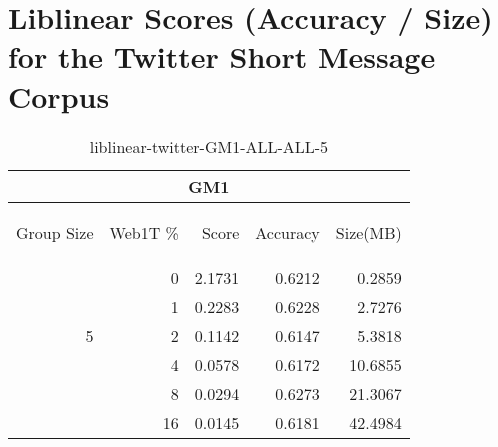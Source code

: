 \chapter{Liblinear Scores (Accuracy / Size) for the Twitter Short Message Corpus}

\begin{center}
\begin{table}[htbp] 
 \begin{center}
\begin{tabular}{ | r | r | r | r | r |}
\hline
\multicolumn{5}{|c|}{GM1}\\
\hline
\begin{sideways}Group Size\end{sideways} & \begin{sideways}Web1T \%\end{sideways} & \begin{sideways}Score\end{sideways} & \begin{sideways}Accuracy\end{sideways} & \begin{sideways}Size(MB)\end{sideways}\\
\hline
\multirow{5}{*}{5}
 & 0 & 2.1731 & 0.6212 & 0.2859\\ \cline{2-5}
 & 1 & 0.2283 & 0.6228 & 2.7276\\ \cline{2-5}
 & 2 & 0.1142 & 0.6147 & 5.3818\\ \cline{2-5}
 & 4 & 0.0578 & 0.6172 & 10.6855\\ \cline{2-5}
 & 8 & 0.0294 & 0.6273 & 21.3067\\ \cline{2-5}
 & 16 & 0.0145 & 0.6181 & 42.4984\\ \cline{2-5}
\hline
\end{tabular}
\caption{liblinear-twitter-GM1-ALL-ALL-5}
\label{table:liblinear-twitter-GM1-ALL-ALL-5}
\end{center}
 \end{table}
\end{center}

